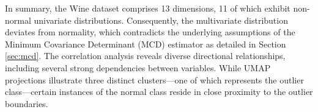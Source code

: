 In summary, the Wine dataset comprises 13 dimensions, 11 of which exhibit non-normal univariate distributions. 
Consequently, the multivariate distribution deviates from normality, which contradicts the underlying assumptions of the Minimum Covariance Determinant (MCD) estimator as detailed in Section \ref{sec:mcd}. 
The correlation analysis reveals diverse directional relationships, including several strong dependencies between variables. 
While UMAP projections illustrate three distinct clusters—one of which represents the outlier class—certain instances of the normal class reside in close proximity to the outlier boundaries. 
